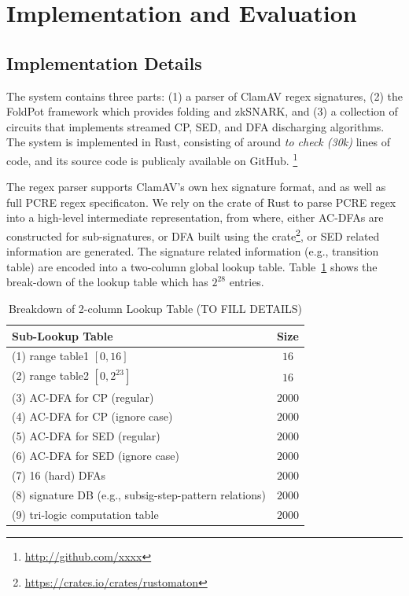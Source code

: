 \section{Implementation and Evaluation}
\subsection{Implementation Details}
  The  system contains three parts: (1)
a parser of ClamAV regex signatures, (2) the FoldPot 
framework which provides folding and zkSNARK, and
(3) a collection of circuits that implements 
streamed CP, SED, and DFA discharging algorithms.
The system is implemented in Rust, consisting of 
around {\em to check (30k)} lines of code, and its source
code is publicaly available on GitHub.
\footnote{\url{http://github.com/xxxx}}

 The regex parser supports ClamAV's own hex signature format,
and as well as full PCRE regex specificaton. We rely on the
 crate of Rust to parse PCRE regex into
a high-level intermediate representation, from where, either
AC-DFAs are constructed for sub-signatures, or 
DFA built using the  crate\footnote{\url{https://crates.io/crates/rustomaton}}, or SED related information are generated.
The signature related information (e.g., transition table)
are encoded into a two-column global lookup table.
Table\ \ref{tbl:lkup} shows
the break-down of the lookup table which has
$2^{28}$ entries.

\begin{small}
\begin{table}
\begin{tabular}{|l|c|}
  \hline
  Sub-Lookup Table &  Size \\
  \hline
  (1) range table1 $[0,16]$ & $16$ \\ 
  (2) range table2 $[0,2^{23}]$ & $16$ \\ 
  (3) AC-DFA for CP (regular) & $2000$ \\ 
  (4) AC-DFA for CP (ignore case) & $2000$ \\
  (5) AC-DFA for SED (regular) & $2000$ \\ 
  (6) AC-DFA for SED (ignore case) & $2000$ \\
  (7) 16 (hard) DFAs  & $2000$ \\
  (8) signature DB (e.g., subsig-step-pattern
  	relations) & $2000$ \\
  (9) tri-logic computation table & $2000$ \\
  \hline
\end{tabular}
\caption{Breakdown of 2-column Lookup Table (TO FILL DETAILS)}
\label{tbl:lkup}
\end{table}
\end{small}


